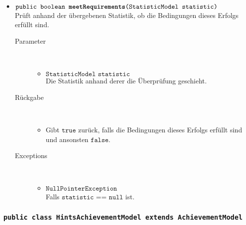 \begin{description}
\begin{itemize}
				\item $\texttt{public boolean \textbf{meetRequirements}(StatisticModel statistic)}$ \\ Prüft anhand der übergebenen Statistik, ob die Bedingungen dieses Erfolgs erfüllt sind.
				\begin{description}
				\item[Parameter] \hfill \\
					\vspace{-.8cm}
					\begin{itemize}
						\item $\texttt{StatisticModel statistic}$ \\ Die Statistik anhand derer die Überprüfung geschieht. 
					\end{itemize}
					\item[Rückgabe] \hfill \\
					\vspace{-.8cm}
					\begin{itemize}
						\item Gibt $\texttt{true}$ zurück, falls die Bedingungen dieses Erfolgs erfüllt sind und ansonsten $\texttt{false}$.
					\end{itemize}
					\item[Exceptions] \hfill \\
					\vspace{-.8cm}
					\begin{itemize}
						\item $\texttt{NullPointerException}$ \\ Falls $\texttt{statistic == null}$ ist.
					\end{itemize}
				\end{description}
				
			\end{itemize}
		\end{description}
		
		\subsubsection{\normalfont \texttt{public class \textbf{HintsAchievementModel} extends AchievementModel}}
		
